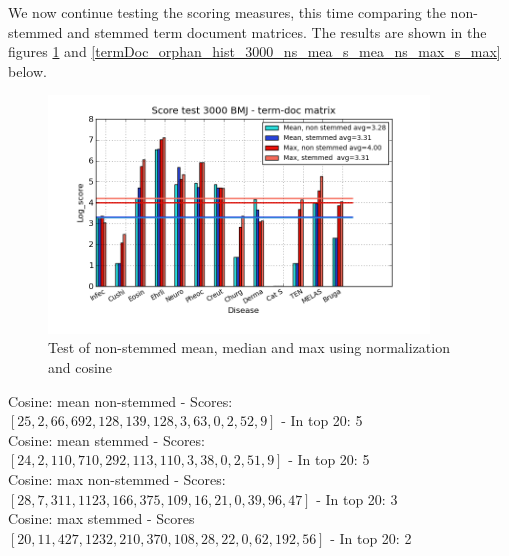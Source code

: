 We now continue testing the scoring measures, this time comparing the
non-stemmed and stemmed term document matrices. The results are shown
in the figures \ref{termDoc_bmj_hist_3000_ns_mea_s_mea_ns_max_s_max}
and \ref{termDoc_orphan_hist_3000_ns_mea_s_mea_ns_max_s_max} below.

\begin{figure}[h!]
        \begin{center}
          \includegraphics[width=0.9\textwidth]{barcharts/termDoc_bmj_hist_3000_ns_mea_s_mea_ns_max_s_max.png}
        \end{center}
        \caption{Test of non-stemmed mean, median and max using normalization and cosine}
        \label{termDoc_bmj_hist_3000_ns_mea_s_mea_ns_max_s_max}
\end{figure}
{\small
Cosine: mean non-stemmed - Scores:\\ $[25, 2, 66, 692, 128, 139, 128, 3, 63, 0, 2, 52, 9]$ - In top 20: 5 \\
Cosine: mean stemmed - Scores:\\ $[24, 2, 110, 710, 292, 113, 110, 3, 38, 0, 2, 51, 9]$ - In top 20: 5 \\
Cosine: max non-stemmed - Scores:\\ $[28, 7, 311, 1123, 166, 375, 109, 16, 21, 0, 39, 96, 47]$ - In top 20: 3 \\
Cosine: max stemmed - Scores\\ $[20, 11, 427, 1232, 210, 370, 108, 28, 22, 0, 62, 192, 56]$ - In top 20: 2
}
